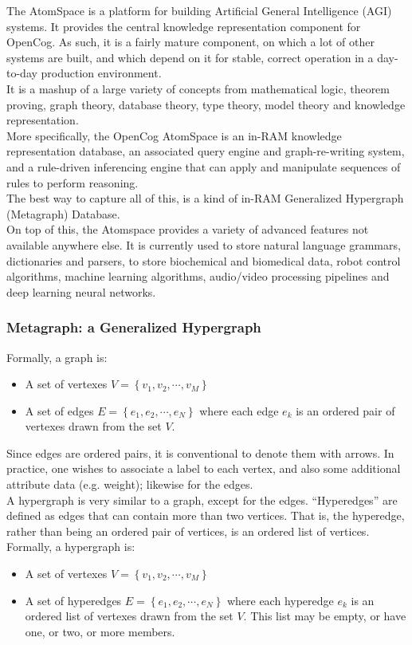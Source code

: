 The AtomSpace is a platform for building Artificial General Intelligence (AGI) systems. It provides the central knowledge representation component for OpenCog. As such, it is a fairly mature component, on which a lot of other systems are built, and which depend on it for stable, correct operation in a day-to-day production environment. \\
It is a mashup of a large variety of concepts from mathematical logic, theorem proving, graph theory, database theory, type theory, model theory and knowledge representation. \\
More specifically, the OpenCog AtomSpace is an in-RAM knowledge representation database, an associated query engine and graph-re-writing system, and a rule-driven inferencing engine that can apply and manipulate sequences of rules to perform reasoning. \\
The best way to capture all of this, is a kind of in-RAM Generalized Hypergraph (Metagraph) Database. \\
On top of this, the Atomspace provides a variety of advanced features not available anywhere else. It is currently used to store natural language grammars, dictionaries and parsers, to store biochemical and biomedical data, robot control algorithms, machine learning algorithms, audio/video processing pipelines and deep learning neural networks.\\

\subsubsection{Metagraph: a Generalized Hypergraph}\label{sec:gen_hypergraph}

Formally, a graph is:
\begin{itemize}
	\item A set of vertexes $V=\left\{v_{1}, v_{2}, \cdots, v_{M}\right\}$
	\item A set of edges $E=\left\{e_{1}, e_{2}, \cdots, e_{N}\right\}$ where each edge $e_{k}$ is an ordered pair of vertexes drawn from the set $V$.
\end{itemize}
Since edges are ordered pairs, it is conventional to denote them with arrows. In practice, one wishes to associate a label to each vertex, and also some additional attribute data (e.g. weight); likewise for the edges. \\

A hypergraph is very similar to a graph, except for the edges. 
\enquote{Hyperedges} are defined as edges that can contain more than two vertices. That is, the hyperedge, rather than being an ordered pair of vertices, is an ordered list of vertices. \\
Formally, a hypergraph is:
\begin{itemize}
	\item A set of vertexes $V=\left\{v_{1}, v_{2}, \cdots, v_{M}\right\}$
	\item A set of hyperedges $E=\left\{e_{1}, e_{2}, \cdots, e_{N}\right\}$ where each hyperedge $e_{k}$ is an ordered list of vertexes drawn from the set $V$. This list may be empty, or have one, or two, or more members.
\end{itemize}


